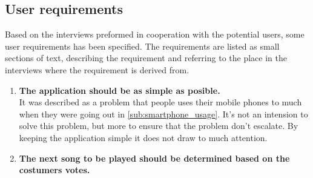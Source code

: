 \subsection{User requirements}
\label{sub:user_requirements}
	
Based on the interviews preformed in cooperation with the potential users, some user requirements has been specified. The requirements are listed as small sections of text, describing the requirement and referring to the place in the interviews where the requirement is derived from.

\begin{enumerate}
	\item \textbf{The application should be as simple as posible.}\\
		It was described as a problem that people uses their mobile phones to much when they were going out in \cref{sub:smartphone_usage}. It's not an intension to solve this problem, but more to ensure that the problem don't escalate. By keeping the application simple it does not draw to much attention. 
		\item \textbf{The next song to be played should be determined based on the costumers votes.} \\
					
\end{enumerate}

